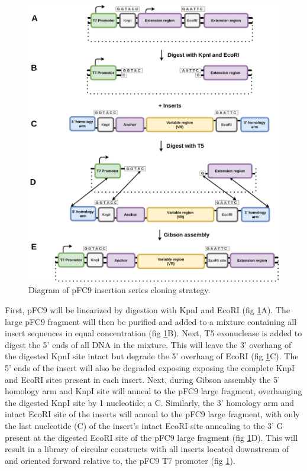 \documentclass[11pt]{article}
\begin{document}
\begin{figure}[H]
	\includegraphics[width=15cm]{images/cloning_diagrams/construct_diagrams-T7-Initiation-series.png}
	\centering
	\caption{Diagram of pFC9 insertion series cloning strategy.}
	\label{clone:T7-insert}
\end{figure}

First, pFC9 will be linearized by digestion with KpnI and EcoRI  (fig \ref{clone:T7-insert}A). The large pFC9 fragment will then be purified and added to a mixture containing all insert sequences in equal concentration  (fig \ref{clone:T7-insert}B). Next, T5 exonuclease is added to digest the 5' ends of all DNA in the mixture. This will leave the 3' overhang of the digested KpnI site intact but degrade the 5' overhang of EcoRI  (fig \ref{clone:T7-insert}C). The 5' ends of the insert will also be degraded exposing exposing the complete KnpI and EcoRI sites present in each insert. Next, during Gibson assembly the 5' homology arm and KnpI site will anneal to the pFC9 large fragment, overhanging the digested KnpI site by 1 nucleotide; a C. Similarly, the 3' homology arm and intact EcoRI site of the inserts will anneal to the pFC9 large fragment, with only the last nucleotide (C) of the insert's intact EcoRI site annealing to the 3' G present at the digested EcoRI site of the pFC9 large fragment (fig \ref{clone:T7-insert}D). This will result in a library of circular constructs with all inserts located downstream of and oriented forward relative to, the pFC9 T7 promoter (fig \ref{clone:T7-insert}). 
\end{document}
